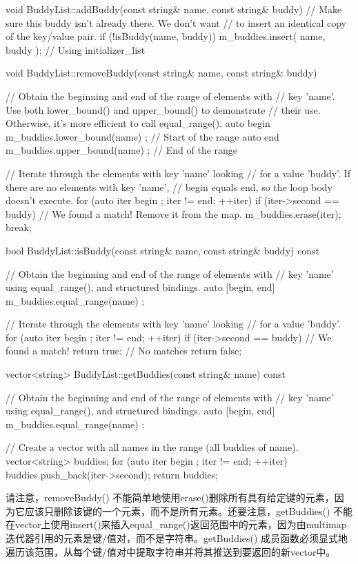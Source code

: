 \begin{cpp}
void BuddyList::addBuddy(const string& name, const string& buddy)
{
    // Make sure this buddy isn't already there. We don't want
    // to insert an identical copy of the key/value pair.
    if (!isBuddy(name, buddy)) {
        m_buddies.insert({ name, buddy }); // Using initializer_list
    }
}

void BuddyList::removeBuddy(const string& name, const string& buddy)
{
    // Obtain the beginning and end of the range of elements with
    // key 'name'. Use both lower_bound() and upper_bound() to demonstrate
    // their use. Otherwise, it's more efficient to call equal_range().
    auto begin { m_buddies.lower_bound(name) }; // Start of the range
    auto end { m_buddies.upper_bound(name) }; // End of the range

    // Iterate through the elements with key 'name' looking
    // for a value 'buddy'. If there are no elements with key 'name',
    // begin equals end, so the loop body doesn't execute.
    for (auto iter { begin }; iter != end; ++iter) {
        if (iter->second == buddy) {
            // We found a match! Remove it from the map.
            m_buddies.erase(iter);
            break;
        }
    }
}

bool BuddyList::isBuddy(const string& name, const string& buddy) const
{
    // Obtain the beginning and end of the range of elements with
    // key 'name' using equal_range(), and structured bindings.
    auto [begin, end] { m_buddies.equal_range(name) };

    // Iterate through the elements with key 'name' looking
    // for a value 'buddy'.
    for (auto iter { begin }; iter != end; ++iter) {
        if (iter->second == buddy) {
            // We found a match!
            return true;
        }
    }
    // No matches
    return false;
}

vector<string> BuddyList::getBuddies(const string& name) const
{
    // Obtain the beginning and end of the range of elements with
    // key 'name' using equal_range(), and structured bindings.
    auto [begin, end] { m_buddies.equal_range(name) };

    // Create a vector with all names in the range (all buddies of name).
    vector<string> buddies;
    for (auto iter { begin }; iter != end; ++iter) {
        buddies.push_back(iter->second);
    }
    return buddies;
}
\end{cpp}

请注意，removeBuddy() 不能简单地使用erase()删除所有具有给定键的元素，因为它应该只删除该键的一个元素，而不是所有元素。还要注意，getBuddies() 不能在vector上使用insert()来插入equal\_range()返回范围中的元素，因为由multimap迭代器引用的元素是键/值对，而不是字符串。getBuddies() 成员函数必须显式地遍历该范围，从每个键/值对中提取字符串并将其推送到要返回的新vector中。

